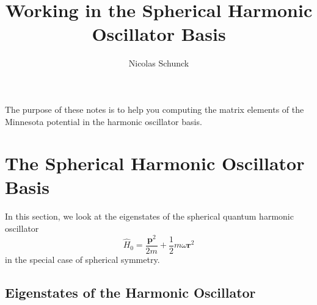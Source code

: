 \documentclass[letterpaper,12pt]{article}
\title{Working in the Spherical Harmonic Oscillator Basis}
\author{Nicolas Schunck}
\newcommand{\gras}[1]{\boldsymbol{#1}}
\begin{document}
\maketitle


The purpose of these notes is to help you computing the matrix elements of the 
Minnesota potential in the harmonic oscillator basis. 


\section{The Spherical Harmonic Oscillator Basis}

In this section, we look at the eigenstates of the spherical quantum harmonic 
oscillator 
\begin{equation}
\hat{H}_{0} = \frac{\gras{p}^{2}}{2m} + \frac{1}{2}m\omega\gras{r}^{2}
\end{equation}
in the special case of spherical symmetry.


\subsection{Eigenstates of the Harmonic Oscillator}
\end{document}
